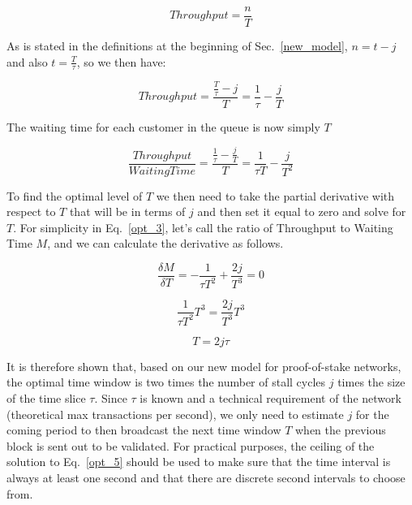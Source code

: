 \documentclass[conference]{IEEEtran}
\begin{document}
\begin{equation}
  Throughput = \frac{n}{T}\label{opt_1}
\end{equation}

As is stated in the definitions at the beginning of Sec.~\ref{new_model},
$n=t-j$ and also $t = \frac{T}{\tau}$, so we then have:

\begin{equation}
  Throughput = \frac{\frac{T}{\tau}-j}{T}=\frac{1}{\tau}-\frac{j}{T}\label{opt_2}
\end{equation}

The waiting time for each customer in the queue is now simply $T$

\begin{equation}
  \frac{Throughput}{WaitingTime} = \frac{\frac{1}{\tau}-\frac{j}{T}}{T} = \frac{1}{\tau T}-\frac{j}{T^2}\label{opt_2}
\end{equation}

To find the optimal level of $T$ we then need to take the partial derivative with respect to $T$ that will
be in terms of $j$ and then set it equal to zero and solve for $T$. For simplicity in Eq.~\ref{opt_3}, 
let's call the ratio of Throughput to Waiting Time $M$, and we can calculate the derivative as follows.

\begin{equation}
  \frac{\delta M}{\delta T} = -\frac{1}{\tau T^2}+\frac{2j}{T^3}=0\label{opt_3}
\end{equation}

\begin{equation}
  \frac{1}{\tau T^2}T^3=\frac{2j}{T^3}T^3\label{opt_4}
\end{equation}

\begin{equation}
  T=2j\tau \label{opt_5}
\end{equation}

It is therefore shown that, based on our new model for proof-of-stake networks, the optimal 
time window is two times the number of stall cycles $j$ times the size of the time slice $\tau$.
Since $\tau$ is known and a technical requirement of the network (theoretical max transactions
per second), we only need to estimate $j$ for the coming period to then broadcast the next time 
window $T$ when the previous block is sent out to be validated. For practical purposes, the 
ceiling of the solution to Eq.~\ref{opt_5} should be used to make sure that the time interval is always at least one
second and that there are discrete second intervals to choose from.
\end{document}
